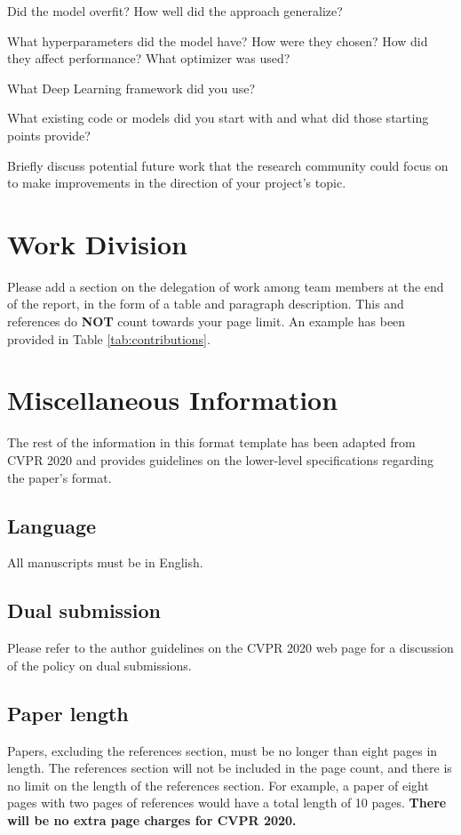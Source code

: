 \documentclass[10pt,twocolumn,letterpaper]{article}
\begin{document}
Did the model overfit? How well did the approach generalize? 

What hyperparameters did the model have? How were they chosen? How did they affect performance? What optimizer was used? 

What Deep Learning framework did you use? 

What existing code or models did you start with and what did those starting points provide? 

Briefly discuss potential future work that the research community could focus on to make improvements in the direction of your project's topic.



\section{Work Division}

Please add a section on the delegation of work among team members at the end of the report, in the form of a table and paragraph description. This and references do \textbf{NOT} count towards your page limit. An example has been provided in Table \ref{tab:contributions}.

\newpage
\newpage
\section{Miscellaneous Information}

The rest of the information in this format template has been adapted from CVPR 2020 and provides guidelines on the lower-level specifications regarding the paper's format.

\subsection{Language}

All manuscripts must be in English.

\subsection{Dual submission}

Please refer to the author guidelines on the CVPR 2020 web page for a
discussion of the policy on dual submissions.

\subsection{Paper length}
Papers, excluding the references section,
must be no longer than eight pages in length. The references section
will not be included in the page count, and there is no limit on the
length of the references section. For example, a paper of eight pages
with two pages of references would have a total length of 10 pages.
{\bf There will be no extra page charges for CVPR 2020.}
\end{document}
